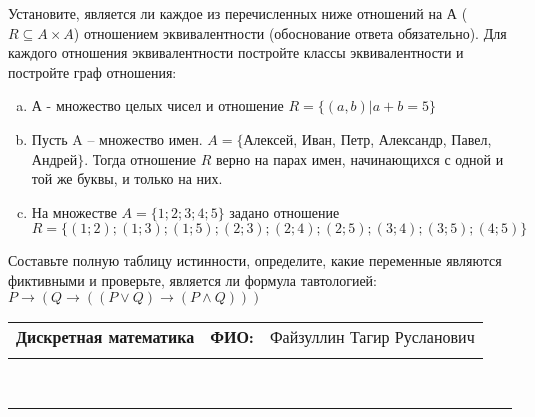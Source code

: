 \documentclass[10pt]{exam}
\newcommand{\class}{Дискретная математика}
\newcommand{\examdate}{}
\begin{document}
\begin{questions}
\question
Установите, является ли каждое из перечисленных ниже отношений на А ($R \subseteq A \times A$) отношением эквивалентности (обоснование ответа обязательно). Для каждого отношения эквивалентности постройте классы 
эквивалентности и постройте граф отношения:
\begin{enumerate} [a)]\setcounter{enumi}{0}
\item А - множество целых чисел и отношение $R = \{(a,b)|a + b = 5\}$
\item Пусть A – множество имен. $A = \{ $Алексей, Иван, Петр, Александр, Павел, Андрей$ \}$. Тогда отношение $R $ верно на парах имен, начинающихся с одной и той же буквы, и только на них.
\item На множестве $A = \{1; 2; 3; 4; 5\}$ задано отношение $R = \{(1; 2); (1; 3); (1; 5); (2; 3); (2; 4); (2; 5); (3; 4); (3; 5); (4; 5)\}$
\end{enumerate}\question Составьте полную таблицу истинности, определите, какие переменные являются фиктивными и проверьте, является ли формула тавтологией:
$ P \rightarrow (Q \rightarrow ((P \lor Q) \rightarrow (P \land Q)))$

\end{questions}
\newpage
\begin{flushright}
\begin{tabular}{p{2.8in} r l}
\textbf{\class} & \textbf{ФИО:} &Файзуллин Тагир Русланович
\\

\textbf{\examdate} &&\\
\end{tabular}\\
\end{flushright}
\rule[1ex]{\textwidth}{.1pt}
\end{document}

